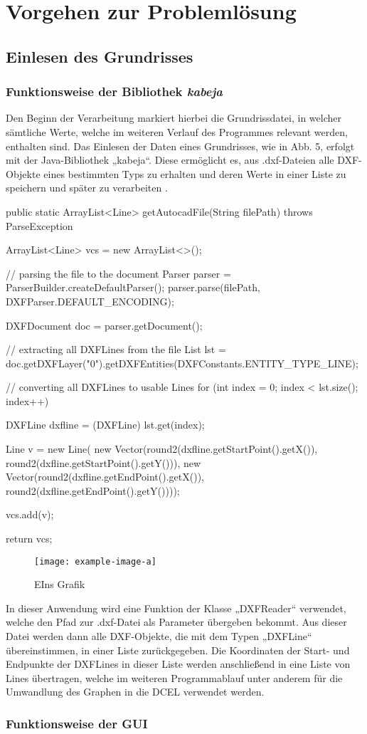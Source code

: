 \chapter{Vorgehen zur Problemlösung}
\section{Einlesen des Grundrisses}
\subsection{Funktionsweise der Bibliothek \textit{kabeja}}
Den Beginn der Verarbeitung markiert hierbei die Grundrissdatei, in welcher sämtliche Werte, welche im weiteren Verlauf des Programmes relevant werden, enthalten sind.
Das Einlesen der Daten eines Grundrisses, wie in Abb. 5, erfolgt mit der Java-Bibliothek „kabeja“. 
Diese ermöglicht es, aus .dxf-Dateien alle DXF-Objekte eines bestimmten Typs zu erhalten und deren Werte in einer Liste zu speichern und später zu verarbeiten \cite{kabeja}.
\begin{code}
public static ArrayList<Line> getAutocadFile(String filePath) throws ParseException {
	ArrayList<Line> vcs = new ArrayList<>();
	
	// parsing the file to the document
	Parser parser = ParserBuilder.createDefaultParser();
	parser.parse(filePath, DXFParser.DEFAULT_ENCODING);
	
	DXFDocument doc = parser.getDocument();
	
	// extracting all DXFLines from the file
	List lst = doc.getDXFLayer("0").getDXFEntities(DXFConstants.ENTITY_TYPE_LINE);
	
	// converting all DXFLines to usable Lines
	for (int index = 0; index < lst.size(); index++) {
		DXFLine dxfline = (DXFLine) lst.get(index);
		
		Line v = new Line(
		new Vector(round2(dxfline.getStartPoint().getX()), round2(dxfline.getStartPoint().getY())),
		new Vector(round2(dxfline.getEndPoint().getX()), round2(dxfline.getEndPoint().getY())));
		
		vcs.add(v);
	}
	
	return vcs;
}
\end{code}
\begin{figure}[H]
	\centering
	\texttt{[image: example-image-a]}
	\caption{EIns Grafik}
\end{figure}
In dieser Anwendung wird eine Funktion der Klasse „DXFReader“ verwendet, welche den Pfad zur .dxf-Datei als Parameter übergeben bekommt. 
Aus dieser Datei werden dann alle DXF-Objekte, die mit dem Typen „DXFLine“ übereinstimmen, in einer Liste zurückgegeben. 
Die Koordinaten der Start- und Endpunkte der DXFLines  in dieser Liste werden anschließend in eine Liste von Lines übertragen, welche im weiteren Programmablauf unter anderem für die Umwandlung des Graphen in die DCEL verwendet werden.
\subsection{Funktionsweise der GUI}

